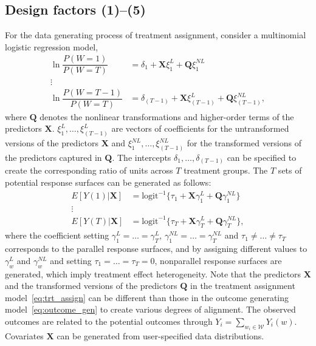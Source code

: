 \subsection{Design factors (1)--(5)}\label{raio_of_units}
For the data generating process of treatment assignment, consider a multinomial logistic regression model, 
\begin{equation}\label{eq:trt_assign}
\begin{split}
\ln  \dfrac{P(W=1)}{P(W=T)} &= \delta_1 + \bm{X}\xi_1^L + \bm{Q}\xi_1^{NL}\\
\vdots \\
\ln  \dfrac{P(W=T-1)}{P(W=T)} &= \delta_{(T-1)} + \bm{X}{\xi_{(T-1)}^{L}} + \bm{Q}\xi_{(T-1)}^{NL},
\end{split}
\end{equation}
where $\bm{Q}$ denotes the nonlinear transformations and higher-order terms of the predictors $\bm{X}$. $\xi_1^L,\ldots,  \xi_{(T-1)}^{L}$ are vectors of coefficients for the untransformed versions of the predictors $\bm{X}$ and $\xi_1^{NL}, \ldots, \xi_{(T-1)}^{NL}$ for the transformed versions of the predictors captured in $\bm{Q}$. 
The intercepts $\delta_1, \ldots,\delta_{(T-1)}$  can be specified to create the corresponding ratio of units across $T$ treatment groups. The $T$ sets of potential response surfaces can be generated as follows:
\begin{equation} \label{eq:outcome_gen}
\begin{split}
E[Y(1) | \bm{X}]& = \text{logit}^{-1}  \{ \tau_1+  \bm{X}\gamma_1^{L} + \bm{Q} \gamma_1^{NL} \} \\
\vdots \\
E[Y(T) | \bm{X}]& =  \text{logit}^{-1}  \{ \tau_T+\bm{X}\gamma_T^{L} + \bm{Q} \gamma_T^{NL} \},
\end{split}
\end{equation}
where the coefficient setting $\gamma_1^L = \ldots = \gamma_T^L$, $\gamma_1^{NL} = \ldots = \gamma_T^{NL}$ and $\tau_1 \neq \ldots \neq \tau_T$ corresponds to the parallel response surfaces, and by assigning different values to $\gamma_w^L$ and $\gamma_w^{NL}$ and setting $\tau_1 = \ldots = \tau_T =0$, nonparallel response surfaces are generated, which imply treatment effect heterogeneity. Note that the predictors $\bm{X}$ and the transformed versions of the predictors $\bm{Q}$ in the treatment assignment model~\eqref{eq:trt_assign} can be different than those in the outcome generating model~\eqref{eq:outcome_gen} to create various degrees of alignment.  The observed outcomes are related to the potential outcomes through $Y_i = \sum_{w_i \in \mathscr{W}} Y_i(w)$. Covariates $\bm{X}$ can be generated from user-specified data distributions. 

